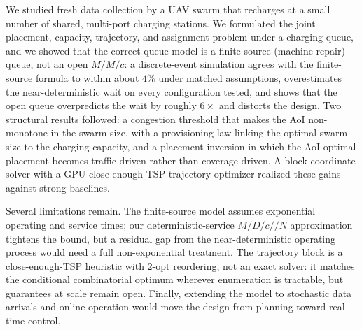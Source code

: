 We studied fresh data collection by a UAV swarm that recharges at a small number
of shared, multi-port charging stations. We formulated the joint placement,
capacity, trajectory, and assignment problem under a charging queue, and we
showed that the correct queue model is a finite-source (machine-repair) queue,
not an open $M/M/c$: a discrete-event simulation agrees with the
finite-source formula to within about $4\%$ under matched assumptions, overestimates
the near-deterministic wait on every configuration tested, and shows that the open
queue overpredicts the wait by roughly $6\times$ and distorts the design. Two structural results followed: a
congestion threshold that makes the AoI non-monotone in the swarm size, with a
provisioning law linking the optimal swarm size to the charging capacity, and a
placement inversion in which the AoI-optimal placement becomes traffic-driven
rather than coverage-driven. A block-coordinate solver with a GPU close-enough-TSP trajectory optimizer
realized these gains against strong baselines.

Several limitations remain. The finite-source model assumes exponential operating
and service times; our deterministic-service $M/D/c//N$ approximation tightens the
bound, but a residual gap from the near-deterministic operating process would need a
full non-exponential treatment. The trajectory block is a close-enough-TSP heuristic
with $2$-opt reordering, not an exact solver: it matches the conditional
combinatorial optimum wherever enumeration is tractable, but guarantees at scale
remain open. Finally, extending the model to stochastic data arrivals and online
operation would move the design from planning toward real-time control.
